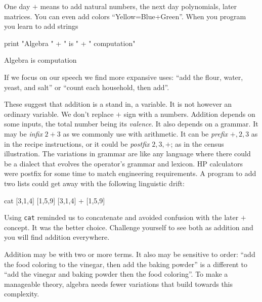 

One day  $+$ means to add natural numbers, the next day 
polynomials, later matrices.  
You can even add colors ``Yellow=Blue+Green''. When you program 
you learn to add strings
\begin{center}
\begin{notebookin}
print "Algebra " + " is " + " computation"
\end{notebookin}
\begin{notebookout}
Algebra is computation
\end{notebookout}
\end{center}
If we focus on our 
speech we find more expansive uses:
``add the flour, water, yeast, and salt'' or  
``count each household, then add''.

These suggest that addition is a stand in, a variable.  It is not however 
an ordinary variable.  We don't replace $+$ sign with a numbers.  
Addition depends on some inputs, the total 
number being its \emph{valence}.    It also depends on a grammar.
It may be \emph{infix} $2+3$ as we commonly 
use with arithmetic.  It can be \emph{prefix} $+,2,3$ as in the recipe instructions,
or it could be \emph{postfix} $2,3,+$; as in the census illustration.  
The variations in grammar are like any language 
where there could be a dialect that evolves the operator's grammar and lexicon.
 HP calculators were postfix for some time to match engineering requirements.
A program to add two lists could get away with the following linguistic drift:
\begin{center}
\begin{notebookin}
cat [3,1,4] [1,5,9]
[3,1,4] + [1,5,9]
\end{notebookin}
\begin{notebookout}[2]
[3,1,4,1,5,9]
[4,6,13]
\end{notebookout}
\end{center}
Using \texttt{cat} reminded us to concatenate and avoided confusion with the
later $+$ concept.  It was the better choice. Challenge yourself to see both as
addition and you will find addition everywhere. 

Addition  may be with two or more terms.  It also may be 
sensitive to order: ``add the food coloring to the vinegar, then add the baking
powder'' is a different to ``add the vinegar and baking powder then the
food coloring''.  To make a manageable theory, algebra needs fewer variations that 
build towards this complexity.



